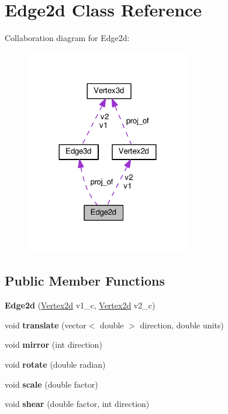 \hypertarget{classEdge2d}{}\section{Edge2d Class Reference}
\label{classEdge2d}


Collaboration diagram for Edge2d\+:
\nopagebreak
\begin{figure}[H]
\begin{center}
\leavevmode
\includegraphics[width=204pt]{classEdge2d__coll__graph}
\end{center}
\end{figure}
\subsection*{Public Member Functions}
\begin{DoxyCompactItemize}
\item 
{\bfseries Edge2d} (\hyperlink{classVertex2d}{Vertex2d} v1\+\_\+c, \hyperlink{classVertex2d}{Vertex2d} v2\+\_\+c)\hypertarget{classEdge2d_a4cb7474a42b6736602cb7d4d86b6fab6}{}\label{classEdge2d_a4cb7474a42b6736602cb7d4d86b6fab6}

\item 
void {\bfseries translate} (vector$<$ double $>$ direction, double units)\hypertarget{classEdge2d_a6cffdd19332b65ab7777d220dc251308}{}\label{classEdge2d_a6cffdd19332b65ab7777d220dc251308}

\item 
void {\bfseries mirror} (int direction)\hypertarget{classEdge2d_aa03f4e523f21276047f28d2caba4dc69}{}\label{classEdge2d_aa03f4e523f21276047f28d2caba4dc69}

\item 
void {\bfseries rotate} (double radian)\hypertarget{classEdge2d_ad71932ada97c36f8179b139143d54a00}{}\label{classEdge2d_ad71932ada97c36f8179b139143d54a00}

\item 
void {\bfseries scale} (double factor)\hypertarget{classEdge2d_ae78424e5ef424ba038bbd4067598f93f}{}\label{classEdge2d_ae78424e5ef424ba038bbd4067598f93f}

\item 
void {\bfseries shear} (double factor, int direction)\hypertarget{classEdge2d_ab4a63d9d04470c857fcb268f31867595}{}\label{classEdge2d_ab4a63d9d04470c857fcb268f31867595}

\end{DoxyCompactItemize}
